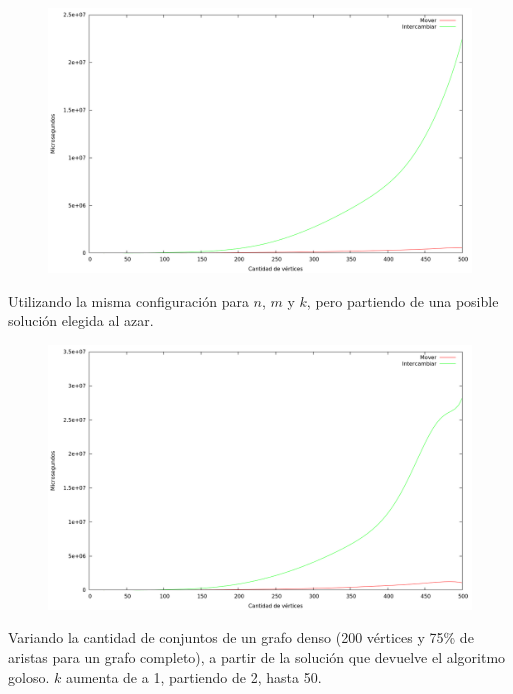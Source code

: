 \begin{figure}[H]
  \begin{center}
    \includegraphics[scale=0.35]{imagenes/local-goloso-n-tiempo.png}
  \end{center}
\end{figure}

Utilizando la misma configuración para $n$, $m$ y $k$, pero partiendo de una
posible solución elegida al azar.

\begin{figure}[H]
  \begin{center}
    \includegraphics[scale=0.35]{imagenes/local-random-n-tiempo.png}
  \end{center}
\end{figure}

Variando la cantidad de conjuntos de un grafo denso (200 vértices y 75\% de
aristas para un grafo completo), a partir de la solución que devuelve el
algoritmo goloso. $k$ aumenta de a 1, partiendo de 2, hasta 50.

